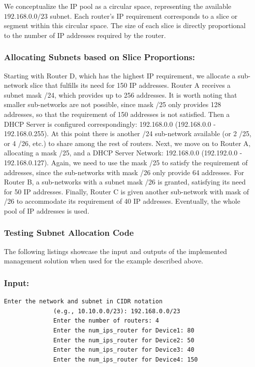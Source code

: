 We conceptualize the IP pool as a circular space, representing the available $192.168.0.0/23$ subnet. Each router's IP requirement corresponds to a slice or segment within this circular space. The size of each slice is directly proportional to the number of IP addresses required by the router.

\subsubsection{Allocating Subnets based on Slice Proportions:}

Starting with Router D, which has the highest IP requirement, we allocate a sub-network slice that fulfills its need for 150 IP addresses. Router A receives a subnet mask /24, which provides up to 256 addresses. It is worth noting that smaller sub-networks are not possible, since mask /25 only provides 128 addresses, so that the requirement of 150 addresses is not satisfied. Then a DHCP Server is configured correspondingly: 192.168.0.0  (192.168.0.0 - 192.168.0.255).
%
At this point there is another /24 sub-network available (or 2 /25, or 4 /26, etc.) to share among the rest of routers. Next, we move on to Router A, allocating a mask /25, and a DHCP Server Network: 192.168.0.0  (192.192.0.0 - 192.168.0.127). Again, we need to use the mask /25 to satisfy the requirement of addresses, since the sub-networks with mask /26 only provide 64 addresses.
%
For Router B, a sub-networks with a subnet mask /26 is granted, satisfying its need for 50 IP addresses. Finally, Router C is given another sub-network with  mask of /26 to accommodate its requirement of 40 IP addresses. Eventually, the whole pool of IP addresses is used.

\subsubsection{Testing Subnet Allocation Code}
The following listings showcase the input and outputs of the implemented management solution when used for the example described above.

\subsubsection{Input:}

\begin{lstlisting}[style=pythonStyle, caption={Routers informations input.}, backgroundcolor=\color{codebackground}]
              Enter the network and subnet in CIDR notation 
              (e.g., 10.10.0.0/23): 192.168.0.0/23
              Enter the number of routers: 4
              Enter the num_ips_router for Device1: 80
              Enter the num_ips_router for Device2: 50
              Enter the num_ips_router for Device3: 40
              Enter the num_ips_router for Device4: 150
\end{lstlisting}
